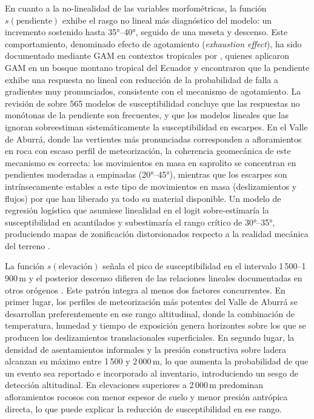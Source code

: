 \documentclass[12pt,a4paper]{article}
\begin{document}
En cuanto a la no-linealidad de las variables morfométricas, la función $s(\text{pendiente})$ exhibe el rasgo no lineal más
diagnóstico del modelo: un incremento sostenido hasta 35°--40°,
seguido de una meseta y descenso. Este comportamiento, denominado
efecto de agotamiento (\textit{exhaustion effect}), ha sido
documentado mediante GAM en contextos tropicales por
\citet{Vorpahl2012}, quienes aplicaron GAM en un bosque montano
tropical del Ecuador y encontraron que la pendiente exhibe una respuesta
no lineal con reducción de la probabilidad de falla a gradientes muy
pronunciados, consistente con el mecanismo de agotamiento. La revisión de \citet{reichenbach2018review} sobre
565 modelos de susceptibilidad concluye que las respuestas no monótonas
de la pendiente son frecuentes, y que los modelos lineales que las
ignoran sobreestiman sistemáticamente la susceptibilidad en escarpes. En el Valle de Aburrá, donde las vertientes más pronunciadas
corresponden a afloramientos en roca con escaso perfil de meteorización, la coherencia geomecánica
de este mecanismo es correcta: los movimientos en masa en saprolito se
concentran en pendientes moderadas a empinadas (20°--45°), mientras que
los escarpes son intrínsecamente estables a este tipo de movimientos en masa (deslizamientos y flujos) por que han
liberado ya todo su material disponible. Un modelo de regresión logística
que asumiese linealidad en el logit sobre-estimaría la susceptibilidad en
acantilados y subestimaría el rango crítico de 30°--35°, produciendo
mapas de zonificación distorsionados respecto a la realidad mecánica del
terreno \citep{sidle2006landslides}.

La función $s(\text{elevación})$ señala el pico de susceptibilidad en el intervalo 1\,500--1\,900\,m y el
posterior descenso difieren de las relaciones lineales documentadas en
otros orógenos \citep{guzzetti2006landslide}. Este patrón integra al
menos dos factores concurrentes. En primer lugar, los perfiles de
meteorización más potentes del Valle de Aburrá se desarrollan
preferentemente en ese rango altitudinal, donde la combinación de
temperatura, humedad y tiempo de exposición genera horizontes sobre los que se producen los deslizamientos
translacionales superficiales. En segundo lugar, la densidad de
asentamientos informales y la presión constructiva sobre ladera alcanzan
su máximo entre 1\,500 y 2\,000\,m, lo que aumenta la probabilidad de
que un evento sea reportado e incorporado al inventario, introduciendo un
sesgo de detección altitudinal. En elevaciones
superiores a 2\,000\,m predominan afloramientos rocosos con menor
espesor de suelo y menor presión antrópica directa, lo que puede explicar la
reducción de susceptibilidad en ese rango.
\end{document}
